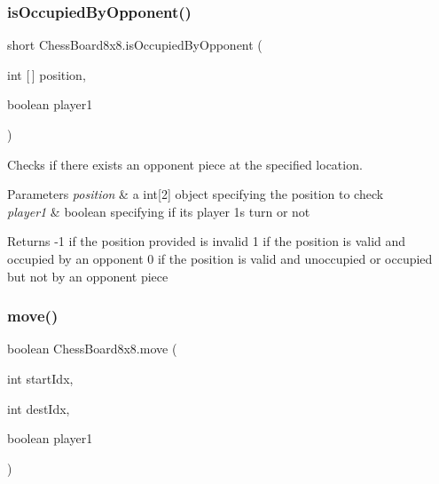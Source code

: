 \subsubsection{\texorpdfstring{is\+Occupied\+By\+Opponent()}{isOccupiedByOpponent()}}
{\footnotesize\ttfamily short Chess\+Board8x8.\+is\+Occupied\+By\+Opponent (\begin{DoxyParamCaption}\item[{int \mbox{[}$\,$\mbox{]}}]{position,  }\item[{boolean}]{player1 }\end{DoxyParamCaption})}

Checks if there exists an opponent piece at the specified location. 
\begin{DoxyParams}{Parameters}
{\em position} & a int\mbox{[}2\mbox{]} object specifying the position to check \\
\hline
{\em player1} & boolean specifying if it\textquotesingle{}s player 1\textquotesingle{}s turn or not \\
\hline
\end{DoxyParams}
\begin{DoxyReturn}{Returns}
-\/1 if the position provided is invalid 1 if the position is valid and occupied by an opponent 0 if the position is valid and unoccupied or occupied but not by an opponent piece 
\end{DoxyReturn}
\mbox{\label{class_chess_board8x8_ae2857331221517049fbfa8937e9fd97a}} 
\subsubsection{\texorpdfstring{move()}{move()}\hspace{0.1cm}{\footnotesize\ttfamily [1/3]}}
{\footnotesize\ttfamily boolean Chess\+Board8x8.\+move (\begin{DoxyParamCaption}\item[{int}]{start\+Idx,  }\item[{int}]{dest\+Idx,  }\item[{boolean}]{player1 }\end{DoxyParamCaption})}

